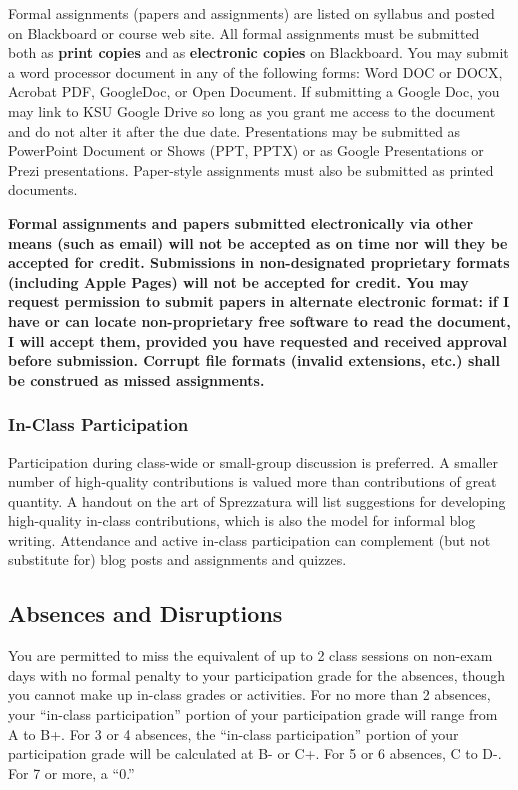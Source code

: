 \documentclass[]{article}
\begin{document}
Formal assignments (papers and assignments) are listed on syllabus and
posted on Blackboard or course web site. All formal assignments must be
submitted both as \textbf{print copies} and as \textbf{electronic
copies} on Blackboard. You may submit a word processor document in any
of the following forms: Word DOC or DOCX, Acrobat PDF, GoogleDoc, or
Open Document. If submitting a Google Doc, you may link to KSU Google
Drive so long as you grant me access to the document and do not alter it
after the due date. Presentations may be submitted as PowerPoint
Document or Shows (PPT, PPTX) or as Google Presentations or Prezi
presentations. Paper-style assignments must also be submitted as printed
documents.

\textbf{Formal assignments and papers submitted electronically via other
means (such as email) will not be accepted as on time nor will they be
accepted for credit. Submissions in non-designated proprietary formats
(including Apple Pages) will not be accepted for credit. You may request
permission to submit papers in alternate electronic format: if I have or
can locate non-proprietary free software to read the document, I will
accept them, provided you have requested and received approval before
submission. Corrupt file formats (invalid extensions, etc.) shall be
construed as missed assignments. }

\subsubsection{In-Class Participation}\label{in-class-participation}

Participation during class-wide or small-group discussion is preferred.
A smaller number of high-quality contributions is valued more than
contributions of great quantity. A handout on the art of Sprezzatura
will list suggestions for developing high-quality in-class
contributions, which is also the model for informal blog writing.
Attendance and active in-class participation can complement (but not
substitute for) blog posts and assignments and quizzes.

\subsection{Absences and Disruptions}\label{absences-and-disruptions}

You are permitted to miss the equivalent of up to 2 class sessions on
non-exam days with no formal penalty to your participation grade for the
absences, though you cannot make up in-class grades or activities. For
no more than 2 absences, your ``in-class participation'' portion of your
participation grade will range from A to B+. For 3 or 4 absences, the
``in-class participation'' portion of your participation grade will be
calculated at B- or C+. For 5 or 6 absences, C to D-. For 7 or more, a
``0.''
\end{document}
